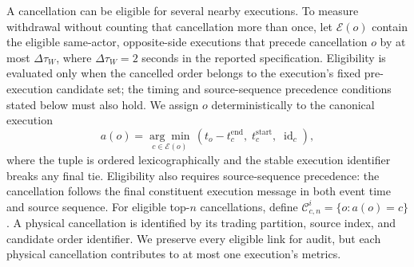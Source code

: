 \documentclass[11pt]{article}
\begin{document}
A cancellation can be eligible for several nearby executions. To measure withdrawal without counting that
cancellation more than once, let $\mathcal E(o)$ contain the eligible same-actor, opposite-side executions that precede
cancellation $o$ by at most $\Delta\tau_W$, where $\Delta\tau_W=2$ seconds in the reported specification. Eligibility is
evaluated only when the cancelled order belongs to the execution's fixed pre-execution candidate set; the timing and
source-sequence precedence conditions stated below must also hold. We assign $o$ deterministically to the canonical execution
\begin{equation}
    a(o)=\underset{c\in\mathcal E(o)}{\arg\min}\,
    \left(t_o-t_c^{\mathrm{end}},\;t_c^{\mathrm{start}},\;\operatorname{id}_c\right),
    \label{eq:canonical_cancel_assignment}
\end{equation}
where the tuple is ordered lexicographically and the stable execution identifier breaks any final tie. Eligibility also
requires source-sequence precedence: the cancellation follows the final constituent execution message in both event time and source
sequence. For eligible top-$n$ cancellations, define $\mathcal{C}_{c,n}^{i}=\{o:a(o)=c\}$. A physical cancellation is
identified by its trading partition, source index, and candidate order identifier. We preserve every eligible link for
audit, but each physical cancellation contributes to at most one execution's metrics.
\end{document}
